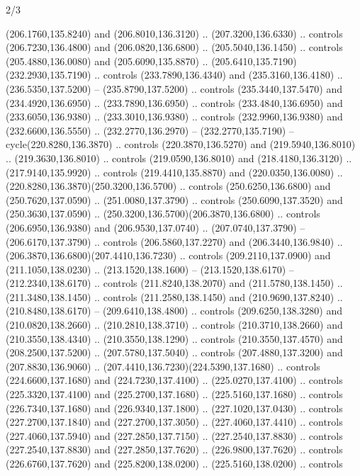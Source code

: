 \begin{flagdescription}{2/3}
\begin{scope}[xshift=0.5\flaglength,yshift=0.5\flagwidth,scale=\flagwidth/259.2]
\begin{scope}[y=0.8pt, x=0.8pt, yscale=-1,shift={(-243,-162)}]
      (206.1760,135.8240) and (206.8010,136.3120) .. (207.3200,136.6330) .. controls
      (206.7230,136.4800) and (206.0820,136.6800) .. (205.5040,136.1450) .. controls
      (205.4880,136.0080) and (205.6090,135.8870) ..
      (205.6410,135.7190)(232.2930,135.7190) .. controls (233.7890,136.4340) and
      (235.3160,136.4180) .. (236.5350,137.5200) -- (235.8790,137.5200) .. controls
      (235.3440,137.5470) and (234.4920,136.6950) .. (233.7890,136.6950) .. controls
      (233.4840,136.6950) and (233.6050,136.9380) .. (233.3010,136.9380) .. controls
      (232.9960,136.9380) and (232.6600,136.5550) .. (232.2770,136.2970) --
      (232.2770,135.7190) -- cycle(220.8280,136.3870) .. controls
      (220.3870,136.5270) and (219.5940,136.8010) .. (219.3630,136.8010) .. controls
      (219.0590,136.8010) and (218.4180,136.3120) .. (217.9140,135.9920) .. controls
      (219.4410,135.8870) and (220.0350,136.0080) ..
      (220.8280,136.3870)(250.3200,136.5700) .. controls (250.6250,136.6800) and
      (250.7620,137.0590) .. (251.0080,137.3790) .. controls (250.6090,137.3520) and
      (250.3630,137.0590) .. (250.3200,136.5700)(206.3870,136.6800) .. controls
      (206.6950,136.9380) and (206.9530,137.0740) .. (207.0740,137.3790) --
      (206.6170,137.3790) .. controls (206.5860,137.2270) and (206.3440,136.9840) ..
      (206.3870,136.6800)(207.4410,136.7230) .. controls (209.2110,137.0900) and
      (211.1050,138.0230) .. (213.1520,138.1600) -- (213.1520,138.6170) --
      (212.2340,138.6170) .. controls (211.8240,138.2070) and (211.5780,138.1450) ..
      (211.3480,138.1450) .. controls (211.2580,138.1450) and (210.9690,137.8240) ..
      (210.8480,138.6170) -- (209.6410,138.4800) .. controls (209.6250,138.3280) and
      (210.0820,138.2660) .. (210.2810,138.3710) .. controls (210.3710,138.2660) and
      (210.3550,138.4340) .. (210.3550,138.1290) .. controls (210.3550,137.4570) and
      (208.2500,137.5200) .. (207.5780,137.5040) .. controls (207.4880,137.3200) and
      (207.8830,136.9060) .. (207.4410,136.7230)(224.5390,137.1680) .. controls
      (224.6600,137.1680) and (224.7230,137.4100) .. (225.0270,137.4100) .. controls
      (225.3320,137.4100) and (225.2700,137.1680) .. (225.5160,137.1680) .. controls
      (226.7340,137.1680) and (226.9340,137.1800) .. (227.1020,137.0430) .. controls
      (227.2700,137.1840) and (227.2700,137.3050) .. (227.4060,137.4410) .. controls
      (227.4060,137.5940) and (227.2850,137.7150) .. (227.2540,137.8830) .. controls
      (227.2540,137.8830) and (227.2850,137.7620) .. (226.9800,137.7620) .. controls
      (226.6760,137.7620) and (225.8200,138.0200) .. (225.5160,138.0200) .. controls

\end{scope}
\end{scope}
\end{flagdescription}

